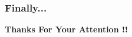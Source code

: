 \documentclass[11pt,aspectratio=169]{beamer}
\begin{document}
{
%
\begin{frame}\frametitle{{\color{white}Finally...}}


	\centering

	{\vspace{17em} \Huge {\color{white}	\textbf{Thanks For Your Attention !!}\\}}
\end{frame}

}


\end{document}
